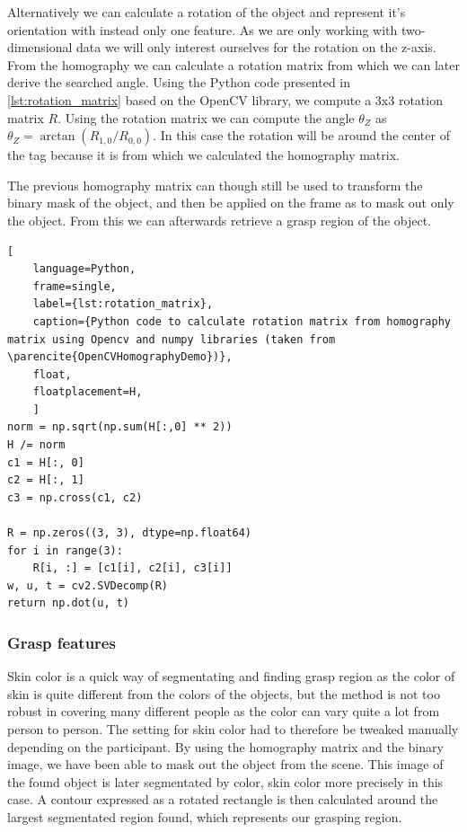 Alternatively we can calculate a rotation of the object and represent it's orientation with instead only one feature. As we are only working with two-dimensional data we will only interest ourselves for the rotation on the z-axis. From the homography we can calculate a rotation matrix from which we can later derive the searched angle. Using the Python code presented in \ref{lst:rotation_matrix} based on the OpenCV library, we compute a 3x3 rotation matrix \(R\). Using the rotation matrix we can compute the angle \(\theta_Z\) as \(\theta_Z = \arctan(R_{1,0} / R_{0,0})\). In this case the rotation will be around the center of the tag because it is from which we calculated the homography matrix.

The previous homography matrix can though still be used to transform the binary mask of the object, and then be applied on the frame as to mask out only the object. From this we can afterwards retrieve a grasp region of the object.

\begin{lstlisting}[
	language=Python,
	frame=single,
	label={lst:rotation_matrix},
	caption={Python code to calculate rotation matrix from homography matrix using Opencv and numpy libraries (taken from \parencite{OpenCVHomographyDemo})},
	float,
	floatplacement=H,
	]
norm = np.sqrt(np.sum(H[:,0] ** 2))
H /= norm
c1 = H[:, 0]
c2 = H[:, 1]
c3 = np.cross(c1, c2)

R = np.zeros((3, 3), dtype=np.float64)
for i in range(3):
	R[i, :] = [c1[i], c2[i], c3[i]]
w, u, t = cv2.SVDecomp(R)
return np.dot(u, t)
\end{lstlisting}

\subsubsection{Grasp features}

Skin color is a quick way of segmentating and finding grasp region as the color of skin is quite different from the colors of the objects, but the method is not too robust in covering many different people as the color can vary quite a lot from person to person. The setting for skin color had to therefore be tweaked manually depending on the participant. By using the homography matrix and the binary image, we have been able to mask out the object from the scene. This image of the found object is later segmentated by color, skin color more precisely in this case. A contour expressed as a rotated rectangle is then calculated around the largest segmentated region found, which represents our grasping region.

